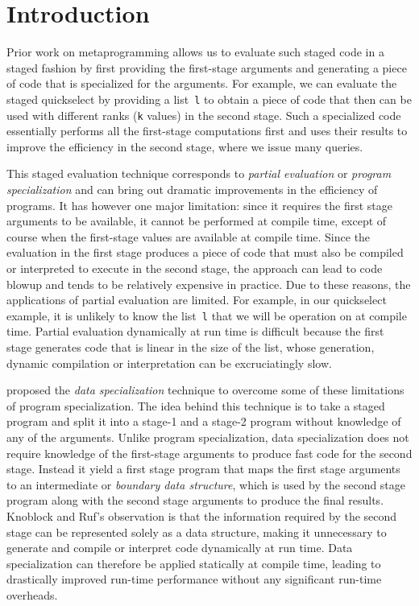 \section{Introduction}


Prior work on metaprogramming allows us to evaluate such staged code
in a staged fashion by first providing the first-stage arguments and
generating a piece of code that is specialized for the arguments.  For
example, we can evaluate the staged quickselect by providing a
list~\texttt{l} to obtain a piece of code that then can be used with
different ranks (\texttt{k} values) in the second stage.  Such a
specialized code essentially performs all the first-stage computations
first and uses their results to improve the efficiency in the second
stage, where we issue many queries.  

This staged evaluation technique corresponds to {\em partial
  evaluation} or {\em program specialization} and can bring out
dramatic improvements in the efficiency of programs.  It has however
one major limitation: since it requires the first stage arguments to
be available, it cannot be performed at compile time, except of course
when the first-stage values are available at compile time.  Since the
evaluation in the first stage produces a piece of code that must also
be compiled or interpreted to execute in the second stage, the
approach can lead to code blowup and tends to be relatively expensive
in practice.  Due to these reasons, the applications of partial
evaluation are limited.  For example, in our quickselect example, it
is unlikely to know the list~\texttt{l} that we will be operation on
at compile time. Partial evaluation dynamically at run time is
difficult because the first stage generates code that is linear in the
size of the list, whose generation, dynamic compilation or
interpretation can be excruciatingly slow.

\cite{knoblock96} proposed the {\em data specialization}
technique to overcome some of these limitations of program
specialization.  The idea behind this technique is to take a staged
program and split it into a stage-1 and a stage-2 program without
knowledge of any of the arguments.  Unlike program specialization,
data specialization does not require knowledge of the first-stage
arguments to produce fast code for the second stage.  Instead it yield
a first stage program that maps the first stage arguments to an
intermediate or {\em boundary data structure}, which is used by the
second stage program along with the second stage arguments to produce
the final results.  Knoblock and Ruf's observation is that the
information required by the second stage can be represented solely as
a data structure, making it unnecessary to generate and compile or
interpret code dynamically at run time.  Data specialization can
therefore be applied statically at compile time, leading to
drastically improved run-time performance without any significant
run-time overheads.

